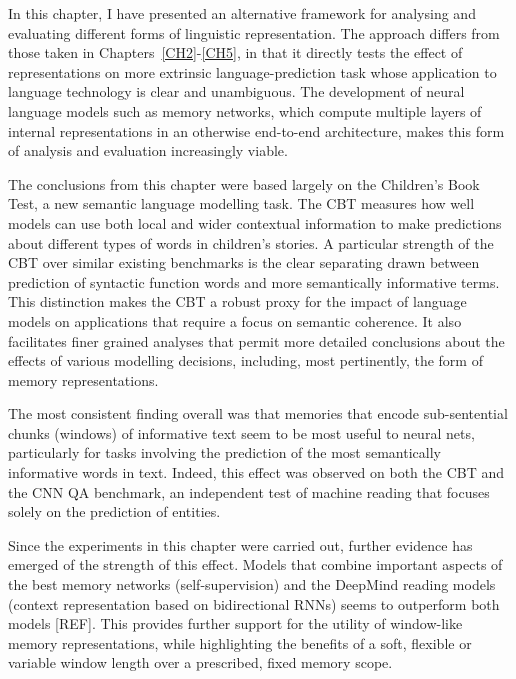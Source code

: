 In this chapter, I have presented an alternative framework for analysing and evaluating different forms of linguistic representation. The approach differs from those taken in Chapters~\ref{CH2}-\ref{CH5}, in that it directly tests the effect of representations on more extrinsic language-prediction task whose application to language technology is clear and unambiguous. The development of neural language models such as memory networks, which compute multiple layers of internal representations in an otherwise end-to-end architecture, makes this form of analysis and evaluation increasingly viable.  

The conclusions from this chapter were based largely on the Children's Book Test, a new semantic language modelling task. The CBT measures how well models can use both local and wider contextual information to make predictions about different types of words in children's stories. A particular strength of the CBT over similar existing benchmarks is the clear separating drawn between prediction of syntactic function words and more semantically informative terms. This distinction makes the CBT a robust proxy for the impact of language models on applications that require a focus on semantic coherence. It also facilitates finer grained analyses that permit more detailed conclusions about the effects of various modelling decisions, including, most pertinently, the form of memory representations. 

The most consistent finding overall was that memories that encode sub-sentential chunks (windows) of informative text 
seem to be most useful to neural nets, particularly for tasks involving the prediction of the most semantically informative words in text. 
Indeed, this effect was observed on both the CBT and the CNN QA benchmark, an independent test of machine reading that focuses solely on the prediction of entities. 

Since the experiments in this chapter were carried out, further evidence has emerged of the strength of this effect. Models that combine important aspects of the best memory networks (self-supervision) and the DeepMind reading models (context representation based on bidirectional RNNs) seems to outperform both models [REF]. This provides further support for the utility of window-like memory representations, while highlighting the benefits of a soft, flexible or variable window length over a prescribed, fixed memory scope.  


